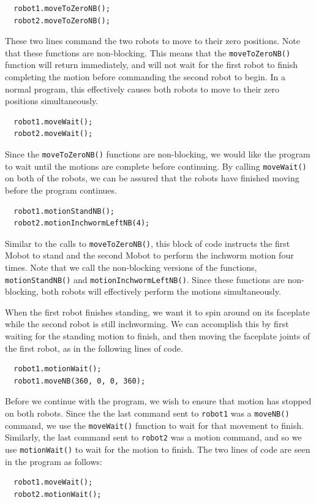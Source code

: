 \documentclass{article}
\begin{document}
\begin{verbatim}
  robot1.moveToZeroNB();
  robot2.moveToZeroNB();
\end{verbatim}
These two lines command the two robots to move to their zero positions.
Note that these functions are non-blocking. This means that the
\texttt{moveToZeroNB()} function will return immediately, and will not
wait for the first robot to finish completing the motion before 
commanding the second robot to begin. In a normal program, this effectively
causes both robots to move to their zero positions simultaneously.

\begin{verbatim}
  robot1.moveWait();
  robot2.moveWait();
\end{verbatim}
Since the \texttt{moveToZeroNB()} functions are non-blocking, we would like
the program to wait until the motions are complete before continuing. By
calling \texttt{moveWait()} on both of the robots, we can be assured that
the robots have finished moving before the program continues.

\begin{verbatim}
  robot1.motionStandNB();
  robot2.motionInchwormLeftNB(4);
\end{verbatim}
Similar to the calls to \texttt{moveToZeroNB()}, this block of code instructs 
the first Mobot to stand and the second Mobot to perform the inchworm motion four times.
Note that we call the non-blocking versions of the
functions, \texttt{motionStandNB()} and \texttt{motionInchwormLeftNB()}. Since these functions are
non-blocking, both robots will effectively perform the motions simultaneously. 

When the first robot finishes standing, we want it to spin around on its faceplate
while the second robot is still inchworming. We can accomplish this by first
waiting for the standing motion to finish, and then moving the faceplate joints
of the first robot, as in the following lines of code.
\begin{verbatim}
  robot1.motionWait();
  robot1.moveNB(360, 0, 0, 360);
\end{verbatim}

Before we continue with the program, we wish to ensure that motion has stopped on both
robots. Since the the last command sent to \texttt{robot1} was a \texttt{moveNB()}
command, we use the \texttt{moveWait()} function to wait for that movement to finish.
Similarly, the last command sent to \texttt{robot2} was a motion command, and so we
use \texttt{motionWait()} to wait for the motion to finish. The two lines of code
are seen in the program as follows:
\begin{verbatim}
  robot1.moveWait();
  robot2.motionWait();
\end{verbatim}
\end{document}
